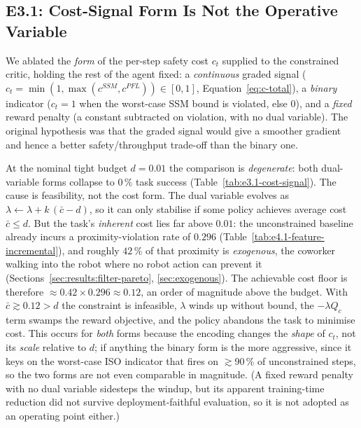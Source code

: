 \documentclass[11pt,a4paper]{report}
\newcommand{\ssm}{SSM}
\newcommand{\pfl}{PFL}
\begin{document}
\subsection{E3.1: Cost-Signal Form Is Not the Operative Variable}
\label{sec:results:cost-signal}

We ablated the \emph{form} of the per-step safety cost $c_t$ supplied
to the constrained critic, holding the rest of the agent fixed: a
\emph{continuous} graded signal
($c_t = \min(1,\max(c^{\ssm},c^{\pfl})) \in [0,1]$,
Equation~\ref{eq:c-total}), a \emph{binary} indicator ($c_t = 1$ when
the worst-case \ssm{} bound is violated, else $0$), and a \emph{fixed}
reward penalty (a constant subtracted on violation, with no dual
variable). The original hypothesis was that the graded signal would
give a smoother gradient and hence a better safety/throughput trade-off
than the binary one.

At the nominal tight budget $d = 0.01$ the comparison is
\emph{degenerate}: both dual-variable forms collapse to $0\,\%$ task
success (Table~\ref{tab:e3.1-cost-signal}). The cause is feasibility,
not the cost form. The dual variable evolves as
$\lambda \leftarrow \lambda + k\,(\bar c - d)$, so it can only
stabilise if some policy achieves average cost $\bar c \le d$. But the
task's \emph{inherent} cost lies far above $0.01$: the unconstrained
baseline already incurs a proximity-violation rate of $0.296$
(Table~\ref{tab:e4.1-feature-incremental}), and roughly $42\,\%$ of
that proximity is \emph{exogenous}, the coworker walking into the robot
where no robot action can prevent it
(Sections~\ref{sec:results:filter-pareto}, \ref{sec:exogenous}). The
achievable cost floor is therefore
$\approx 0.42 \times 0.296 \approx 0.12$, an order of magnitude above
the budget. With $\bar c \gtrsim 0.12 > d$ the constraint is
infeasible, $\lambda$ winds up without bound, the $-\lambda Q_c$ term
swamps the reward objective, and the policy abandons the task to
minimise cost. This occurs for \emph{both} forms because the encoding
changes the \emph{shape} of $c_t$, not its \emph{scale} relative to
$d$; if anything the binary form is the more aggressive, since it keys
on the worst-case ISO indicator that fires on $\gtrsim$90\,\% of
unconstrained steps, so the two forms are not even comparable in
magnitude. (A fixed reward penalty with no dual variable sidesteps the
windup, but its apparent training-time reduction did not survive
deployment-faithful evaluation, so it is not adopted as an operating
point either.)
\end{document}
